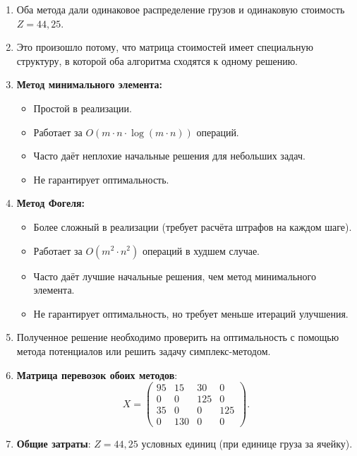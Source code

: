\documentclass[a4paper, final]{article}
\begin{document}
\begin{enumerate}
\item Оба метода дали одинаковое распределение грузов и одинаковую стоимость $Z = 44{,}25$.

\item Это произошло потому, что матрица стоимостей имеет специальную структуру, в которой
оба алгоритма сходятся к одному решению.

\item \textbf{Метод минимального элемента:}
    \begin{itemize}
        \item Простой в реализации.
        \item Работает за $O(m \cdot n \cdot \log(m \cdot n))$ операций.
        \item Часто даёт неплохие начальные решения для небольших задач.
        \item Не гарантирует оптимальность.
    \end{itemize}

\item \textbf{Метод Фогеля:}
    \begin{itemize}
        \item Более сложный в реализации (требует расчёта штрафов на каждом шаге).
        \item Работает за $O(m^2 \cdot n^2)$ операций в худшем случае.
        \item Часто даёт лучшие начальные решения, чем метод минимального элемента.
        \item Не гарантирует оптимальность, но требует меньше итераций улучшения.
    \end{itemize}

\item Полученное решение необходимо проверить на оптимальность с помощью метода потенциалов
или решить задачу симплекс-методом.

\item \textbf{Матрица перевозок обоих методов}:
    \[
    X = \begin{pmatrix}
    95 & 15 & 30 & 0 \\
    0  & 0  & 125 & 0 \\
    35 & 0  & 0  & 125 \\
    0  & 130 & 0  & 0
    \end{pmatrix}.
    \]

\item \textbf{Общие затраты}: $Z = 44{,}25$ условных единиц (при единице груза за ячейку).

\end{enumerate}
\end{document}
